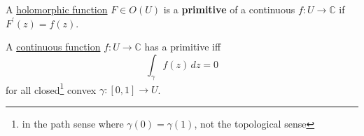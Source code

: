 	\begin{definition}[Primitive]
	  \label{def:primitive-2}
		A \hyperref[def:holomorphic-function-3]{holomorphic function} $F \in O(U)$ is a \textbf{primitive} of a continuous $f: U \to \mathbb{C}$ if $F^\prime (z) = f(z)$. 
	\end{definition} 

	\begin{theorem}
	  \label{thm:existence-of-a-primitive-via-closed-curves}
		A \hyperref[pst-def:continuous_func]{continuous function} $f: U \to \mathbb{C}$ has a primitive iff 
		\begin{equation}
		  \int_\gamma f(z) \,dz = 0 
		\end{equation}
		for all closed\footnote{in the path sense where $\gamma(0) = \gamma(1)$, not the topological sense} convex $\gamma: [0, 1] \to U$. 
	\end{theorem}
